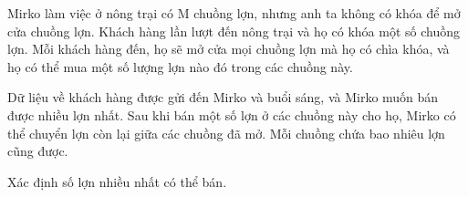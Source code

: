 Mirko làm việc ở nông trại có M chuồng lợn, nhưng anh ta không có khóa  để mở cửa chuồng lợn. Khách hàng lần lượt đến nông trại và họ có khóa một số chuồng lợn. Mỗi khách hàng đến, họ sẽ mở cửa mọi chuồng lợn mà họ có chìa khóa, và  họ có thể mua một số lượng lợn nào đó trong các chuồng này.  

   Dữ liệu về khách hàng được gửi đến Mirko và buổi sáng, và Mirko muốn bán  được nhiều lợn nhất. Sau khi bán một số lợn ở các chuồng này cho họ, Mirko có thể  chuyển lợn còn lại giữa các chuồng đã mở.  Mỗi chuồng chứa bao nhiêu lợn cũng được.  

   Xác định số lợn nhiều nhất có thể bán.